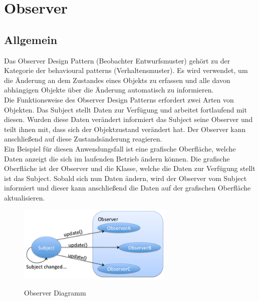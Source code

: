 
\chapter{Observer}

\section{Allgemein}
Das Observer Design Pattern (Beobachter Entwurfsmuster) gehört zu der Kategorie der behavioural 
patterns (Verhaltensmuster). Es wird verwendet, um die Änderung an dem Zustandes eines Objekts zu
erfassen und alle davon abhängigen Objekte über die Änderung automatisch zu
informieren.\\
\newline
Die Funktionsweise des Observer Design Patterns erfordert zwei Arten von Objekten. Das Subject 
stellt Daten zur Verfügung und arbeitet fortlaufend mit diesen. Wurden diese Daten verändert
informiert das Subject seine Observer und teilt ihnen mit, dass sich der Objektzustand verändert 
hat. Der Observer kann anschließend auf diese Zustandsänderung reagieren.\\
\newline
Ein Beispiel für diesen Anwendungsfall ist eine grafische Oberfläche, welche Daten anzeigt 
die sich im laufenden Betrieb ändern können. Die grafische Oberfläche ist der Observer und die 
Klasse, welche die Daten zur Verfügung stellt ist das Subject. Sobald sich nun Daten ändern, 
wird der Observer vom Subject informiert und dieser kann anschließend die Daten auf der 
grafischen Oberfläche aktualisieren.\\
\newline

\begin{figure}[!htbp]
	\centering
	\includegraphics[width=0.66\textwidth]{content/pictures/Observer/observer01.png}
	\label{pic:bild}
	\caption{Observer Diagramm \cite{paulObserver}}
\end{figure}


